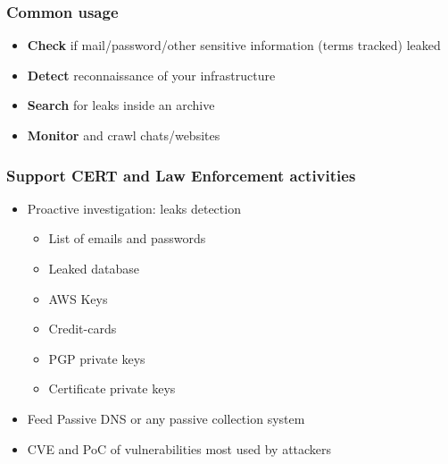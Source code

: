 \documentclass[10pt,aspectratio=169, colorlinks=true, linkcolor=circlBlue]{beamer}
\begin{document}
\begin{frame}
    \frametitle{Common usage}
        \begin{itemize}
                \item {\bf Check} if mail/password/other sensitive information (terms tracked) leaked
                \item {\bf Detect} reconnaissance of your infrastructure
                \item {\bf Search} for leaks inside an archive
                \item {\bf Monitor} and crawl chats/websites
        \end{itemize}
\end{frame}

\begin{frame}
    \frametitle{Support CERT and Law Enforcement activities}
        \begin{itemize}
            \item Proactive investigation: leaks detection
            \begin{itemize}
		        \item List of emails and passwords
		        \item Leaked database
		        \item AWS Keys
		        \item Credit-cards
		        \item PGP private keys
		        \item Certificate private keys
		    \end{itemize}
		    \item Feed Passive DNS or any passive collection system
		    \item CVE and PoC of vulnerabilities most used by attackers
		\end{itemize}
\end{frame}
\end{document}
